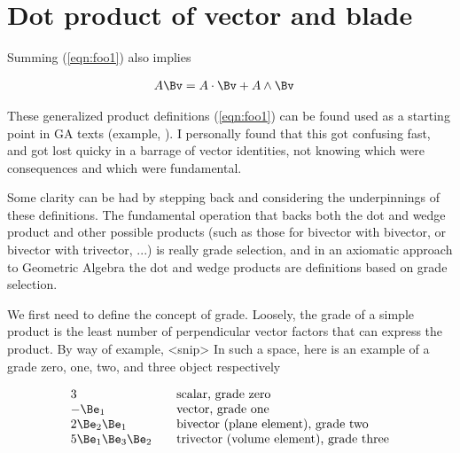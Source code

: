 

\chapter{Dot product of vector and blade}
\label{chap:dotBlade}
{}
\date{Aug 11, 2009}

\beginArtWithToc



Summing (\ref{eqn:foo1}) also implies 

\begin{align}\label{eqn:foo2}
A \Bv &= A \cdot \Bv + A \wedge \Bv
\end{align}

These generalized product definitions (\ref{eqn:foo1}) can be found used as a starting point in GA texts (example, \cite{hestenes1999nfc}).  I personally found that this got confusing fast, and got lost quicky in a barrage of vector identities, not knowing which were consequences and which were fundamental.

Some clarity can be had by stepping back and considering the underpinnings of these definitions.  The fundamental operation that backs both the dot and wedge product and other possible products (such as those for bivector with bivector, or bivector with trivector, ...) is really grade selection, and in an
axiomatic approach to Geometric Algebra the dot and wedge products are definitions based on grade selection.

We first need to define the concept of grade.  Loosely, the grade of a simple product is the least number of perpendicular vector factors that can express the product.  By way of example, <snip>
In such a space, here is an example of a grade zero, one, two, and three object respectively

\begin{align*}
\begin{array}{l l}
3 & \quad \text{scalar, grade zero} \\
-\Be_1 & \quad \text{vector, grade one} \\
2 \Be_2 \Be_1 & \quad \text{bivector (plane element), grade two} \\
5 \Be_1 \Be_3 \Be_2 & \quad \text{trivector (volume element), grade three} \\
\end{array}
\end{align*}

